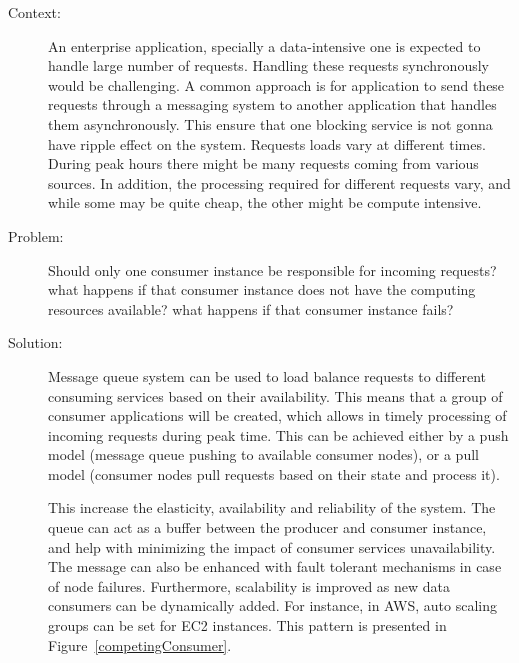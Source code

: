 \documentclass{bmcart}
\begin{document}
\begin{description}
  \item[Context:] An enterprise application, specially a data-intensive one is expected to handle large number of requests. Handling these requests synchronously would be challenging. A common approach is for application to send these requests through a messaging system to another application that handles them asynchronously. This ensure that one blocking service is not gonna have ripple effect on the system. Requests loads vary at different times. During peak hours there might be many requests coming from various sources. In addition, the processing required for different requests vary, and while some may be quite cheap, the other might be compute intensive. 
  \item[Problem:] Should only one consumer instance be responsible for incoming requests? what happens if that consumer instance does not have the computing resources available? what happens if that consumer instance fails? 
  \item[Solution:] Message queue system can be used to load balance requests to different consuming services based on their availability. This means that a group of consumer applications will be created, which allows in timely processing of incoming requests during peak time. This can be achieved either by a push model (message queue pushing to available consumer nodes), or a pull model (consumer nodes pull requests based on their state and process it).

  This increase the elasticity, availability and reliability of the system. The queue can act as a buffer between the producer and consumer instance, and help with minimizing the impact of consumer services unavailability. The message can also be enhanced with fault tolerant mechanisms in case of node failures. Furthermore, scalability is improved as new data consumers can be dynamically added. For instance, in AWS, auto scaling groups can be set for EC2 instances. This pattern is presented in Figure~\ref{competingConsumer}.  
\end{description}


\end{document}
